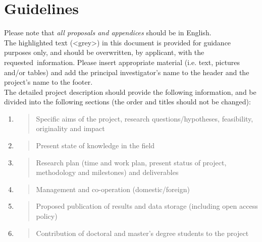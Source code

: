 \newpage

\section*{Guidelines}\label{guidelines}

\noindent
Please note that \emph{all proposals and appendices} should be in
English.\\

\noindent
The highlighted text (<grey>) in this document is provided for guidance purposes only, and should be overwritten, by applicant, with the \mbox{requested information}. Please insert appropriate material (i.e. text, pictures and/or tables) and add the principal investigator’s name to the header and the project’s name to the footer.\\

\noindent
The detailed project description should provide the following
information, and be divided into the following sections (the order and
titles should not be changed):\\
{\it
\begin{enumerate}
\def\labelenumi{\alph{enumi}.}
\setlength\itemsep{-0.5em}
\item
  \begin{quote}
  Specific aims of the project, research questions/hypotheses,
  feasibility, originality and impact
  \end{quote}
\item
  \begin{quote}
  Present state of knowledge in the field
  \end{quote}
\item
  \begin{quote}
  Research plan (time and work plan, present status of project,
  methodology and milestones) and deliverables
  \end{quote}
\item
  \begin{quote}
  Management and co-operation (domestic/foreign)
  \end{quote}
\item
  \begin{quote}
  Proposed publication of results and data storage (including open
  access policy)
  \end{quote}
\item
  \begin{quote}
  Contribution of doctoral and master's degree students to the
  project\\
  \end{quote}
\end{enumerate}
}

